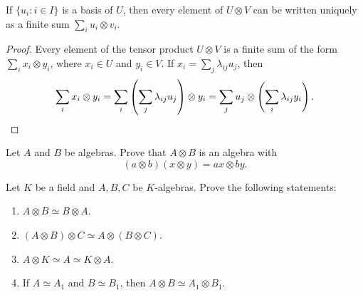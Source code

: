 \begin{corollary}
	If $\{u_i:i\in I\}$ is a basis of $U$, then every element of $U\otimes V$
	can be written uniquely as a finite sum $\sum_{i}u_i\otimes v_i$.
\end{corollary}

\begin{proof}
	Every element of the tensor product $U\otimes V$ is a finite sum 
	of the form $\sum_i x_i\otimes y_i$, where $x_i\in U$ and $y_i\in V$. If  
	$x_i=\sum_j\lambda_{ij}u_j$, then 
	\[
		\sum_i x_i\otimes y_i=\sum_i\left(\sum_j\lambda_{ij}u_j\right)\otimes y_i		
		=\sum_j u_j\otimes\left(\sum_i\lambda_{ij}y_i\right).\qedhere 
	\]
\end{proof}

%

\begin{exercise}
\label{xca:tensor_algebras}
    Let $A$ and $B$ be algebras. Prove that $A\otimes B$ 
    is an algebra with 
	\[
		(a\otimes b)(x\otimes y)=ax\otimes by.
	\]
\end{exercise}


\begin{exercise}
    Let $K$ be a field and $A,B,C$ be $K$-algebras. 
    Prove the following statements:
	\begin{enumerate}
		\item $A\otimes B\simeq B\otimes A$.
		\item $(A\otimes B)\otimes C\simeq A\otimes(B\otimes C)$.
		\item $A\otimes K\simeq A\simeq K\otimes A$.
		\item If $A\simeq A_1$ and $B\simeq B_1$, then $A\otimes B\simeq A_1\otimes B_1$.
	\end{enumerate}
\end{exercise}

